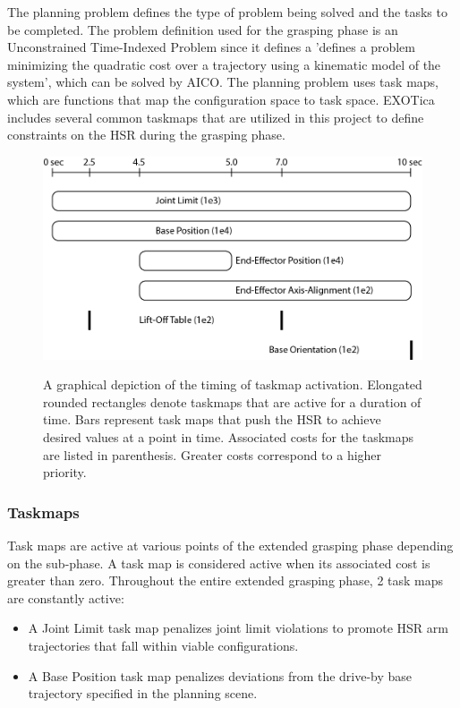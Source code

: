 \documentclass[11pt]{article}
\begin{document}
            \par The planning problem defines the type of problem being solved and the tasks to be completed. The problem definition used for the grasping phase is an Unconstrained Time-Indexed Problem since it defines a 'defines a problem minimizing the quadratic cost over a trajectory using a kinematic model of the system', which can be solved by AICO. The planning problem uses task maps, which are functions that map the configuration space to task space. EXOTica includes several common taskmaps that are utilized in this project to define constraints on the HSR during the grasping phase.
            
            \begin{figure}[ht]
                \centering
                \includegraphics[]{illustrator/taskmap.png}
                \label{fig:taskmap}
                \caption{A graphical depiction of the timing of taskmap activation. Elongated rounded rectangles denote taskmaps that are active for a duration of time. Bars represent task maps that push the HSR to achieve desired values at a point in time. Associated costs for the taskmaps are listed in parenthesis. Greater costs correspond to a higher priority.}
            \end{figure}

            \subsubsection{Taskmaps}
                Task maps are active at various points of the extended grasping phase depending on the sub-phase. A task map is considered active when its associated cost is greater than zero. Throughout the entire extended grasping phase, 2 task maps are constantly active:
                \begin{itemize}
                    \item A Joint Limit task map penalizes joint limit violations to promote HSR arm trajectories that fall within viable configurations.

                    \item A Base Position task map penalizes deviations from the drive-by base trajectory specified in the planning scene.
                \end{itemize}
\end{document}

